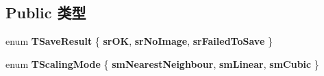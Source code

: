 \subsection*{Public 类型}
\begin{DoxyCompactItemize}
\item 
\hypertarget{class_image_canvas_a0c2b3731815ac22f218b08d36df3bac9}{enum {\bfseries T\+Save\+Result} \{ {\bfseries sr\+O\+K}, 
{\bfseries sr\+No\+Image}, 
{\bfseries sr\+Failed\+To\+Save}
 \}}\label{class_image_canvas_a0c2b3731815ac22f218b08d36df3bac9}

\item 
\hypertarget{class_image_canvas_a224d2497503b5fa611862e028a0c2ef3}{enum {\bfseries T\+Scaling\+Mode} \{ {\bfseries sm\+Nearest\+Neighbour}, 
{\bfseries sm\+Linear}, 
{\bfseries sm\+Cubic}
 \}}\label{class_image_canvas_a224d2497503b5fa611862e028a0c2ef3}

\end{DoxyCompactItemize}
